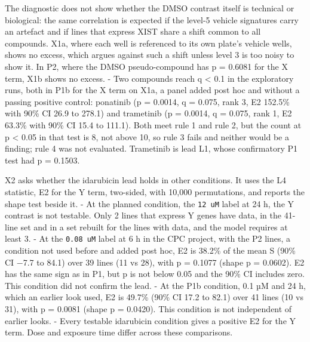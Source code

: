 \documentclass[
  11pt,
  letterpaper,
]{article}
\begin{document}
The diagnostic does not show whether the DMSO contrast itself is
technical or biological: the same correlation is expected if the level-5
vehicle signatures carry an artefact and if lines that express XIST
share a shift common to all compounds. X1a, where each well is
referenced to its own plate's vehicle wells, shows no excess, which
argues against such a shift unless level 3 is too noisy to show it. In
P2, where the DMSO pseudo-compound has p = 0.6081 for the X term, X1b
shows no excess. - Two compounds reach q \textless{} 0.1 in the
exploratory runs, both in P1b for the X term on X1a, a panel added post
hoc and without a passing positive control: ponatinib (p = 0.0014, q =
0.075, rank 3, E2 152.5\% with 90\% CI 26.9 to 278.1) and trametinib (p
= 0.0014, q = 0.075, rank 1, E2 63.3\% with 90\% CI 15.4 to 111.1). Both
meet rule 1 and rule 2, but the count at p \textless{} 0.05 in that test
is 8, not above 10, so rule 3 fails and neither would be a finding; rule
4 was not evaluated. Trametinib is lead L1, whose confirmatory P1 test
had p = 0.1503.

X2 asks whether the idarubicin lead holds in other conditions. It uses
the L4 statistic, E2 for the Y term, two-sided, with 10,000
permutations, and reports the shape test beside it. - At the planned
condition, the \texttt{12\ uM} label at 24 h, the Y contrast is not
testable. Only 2 lines that express Y genes have data, in the 41-line
set and in a set rebuilt for the lines with data, and the model requires
at least 3. - At the \texttt{0.08\ uM} label at 6 h in the CPC project,
with the P2 lines, a condition not used before and added post hoc, E2 is
38.2\% of the mean S (90\% CI −7.7 to 84.1) over 39 lines (11 vs 28),
with p = 0.1077 (shape p = 0.0602). E2 has the same sign as in P1, but p
is not below 0.05 and the 90\% CI includes zero. This condition did not
confirm the lead. - At the P1b condition, 0.1 µM and 24 h, which an
earlier look used, E2 is 49.7\% (90\% CI 17.2 to 82.1) over 41 lines (10
vs 31), with p = 0.0081 (shape p = 0.0420). This condition is not
independent of earlier looks. - Every testable idarubicin condition
gives a positive E2 for the Y term. Dose and exposure time differ across
these comparisons.
\end{document}
